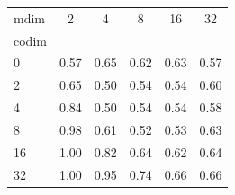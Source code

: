 \begin{tabular}{l|ccccc}
\toprule
mdim & 2 & \textcolor{blue!70!black}{4} & 8 & 16 & 32 \\
codim &  &  &  &  &  \\
\midrule
0 & 0.57 & \textcolor{blue!70!black}{0.65} & 0.62 & 0.63 & 0.57 \\
2 & 0.65 & \textcolor{blue!70!black}{0.50} & 0.54 & 0.54 & 0.60 \\
\textcolor{red!70!black}{4} & \textcolor{red!70!black}{0.84} & \textcolor{purple!70!black}{0.50} & \textcolor{red!70!black}{0.54} & \textcolor{red!70!black}{0.54} & \textcolor{red!70!black}{0.58} \\
8 & 0.98 & \textcolor{blue!70!black}{0.61} & 0.52 & 0.53 & 0.63 \\
16 & 1.00 & \textcolor{blue!70!black}{0.82} & 0.64 & 0.62 & 0.64 \\
32 & 1.00 & \textcolor{blue!70!black}{0.95} & 0.74 & 0.66 & 0.66 \\
\bottomrule
\end{tabular}
